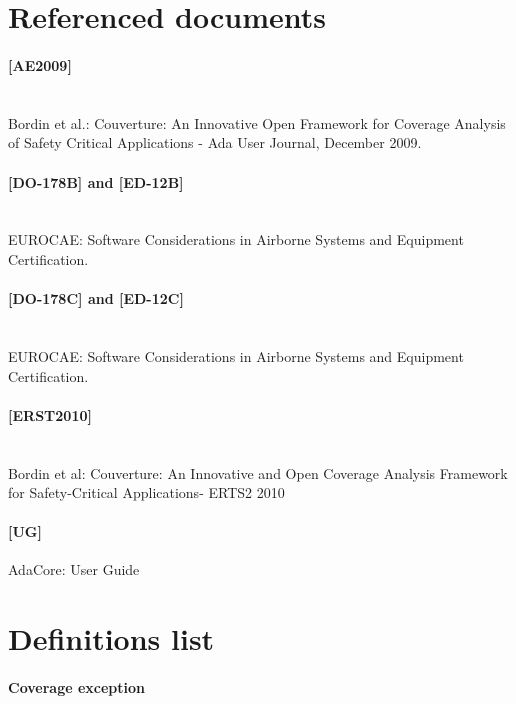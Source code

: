 \newcommand{\erts}{[ERST2010]\space}
\newcommand{\adaeurope}{[AE2009]\space}
\newcommand{\castseventeen}{[CAST17]\space}

\section{Referenced documents}
\paragraph*{\adaeurope} \ \\
Bordin et al.: Couverture: An Innovative Open Framework for Coverage Analysis of Safety Critical Applications - Ada User Journal, December 2009.
\paragraph*{[DO-178B] and [ED-12B]} \ \\
EUROCAE: Software Considerations in Airborne Systems and Equipment Certification.
\paragraph*{[DO-178C] and [ED-12C]} \ \\
EUROCAE: Software Considerations in Airborne Systems and Equipment Certification.
\paragraph*{\erts} \ \\
Bordin et al: Couverture: An Innovative and Open Coverage Analysis Framework for Safety-Critical Applications- ERTS2 2010
\paragraph*{[\xcov UG]}
AdaCore: \xcov User Guide

\section{Definitions list}

\paragraph*{Coverage exception} \ \\

